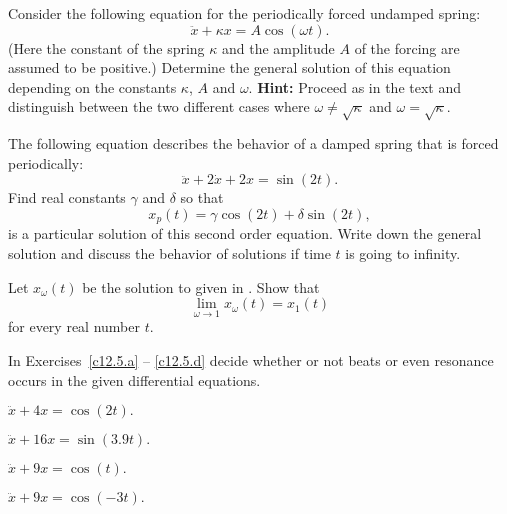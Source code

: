 \documentclass{ximera}
\begin{document}
\EXER

\TEXER


\begin{exercise} \label{c12.5.1}
Consider the following equation for the periodically forced
undamped spring:
\[
\ddot x + \kappa x = A\cos(\omega t).
\]
(Here the constant of the spring $\kappa$ and the amplitude $A$ of the
forcing are assumed to be positive.)  Determine the general solution of
this equation depending on the constants $\kappa$, $A$ and $\omega $.
{\bf Hint:} Proceed as in the text and distinguish between the two
different cases where $\omega \not=\sqrt{\kappa}$ and 
$\omega =\sqrt{\kappa}$.
\end{exercise}

\begin{exercise} \label{c12.5.2}
The following equation describes the behavior of a damped 
spring that is 
forced periodically:
\[
\ddot x + 2\dot x + 2x = \sin(2t).
\]
Find real constants $\gamma$ and $\delta$ so that
\[
x_p(t) = \gamma \cos(2t)+ \delta \sin(2t),
\]
is a particular solution of this second order equation.  Write down the
general solution and discuss the behavior of solutions if time $t$
is going to infinity.
\end{exercise}

\begin{exercise} \label{c12.5.3}
Let $x_\omega(t)$ be the solution to  given in 
.  Show that 
\[
\lim_{\omega\to 1}x_\omega(t) = x_1(t)
\]
for every real number $t$.
\end{exercise} 

\noindent In Exercises~\ref{c12.5.a} -- \ref{c12.5.d} decide whether or not
beats or even resonance occurs in the given differential equations.
\begin{exercise} \label{c12.5.a}
$\ddot{x} + 4x = \cos(2t).$
\end{exercise}
\begin{exercise} \label{c12.5.b}
$\ddot{x} + 16x = \sin(3.9 t).$
\end{exercise}
\begin{exercise} \label{c12.5.c}
$\ddot{x} + 9x = \cos(t).$
\end{exercise}
\begin{exercise} \label{c12.5.d}
$\ddot{x} + 9x = \cos(-3t).$
\end{exercise}
\end{document}
